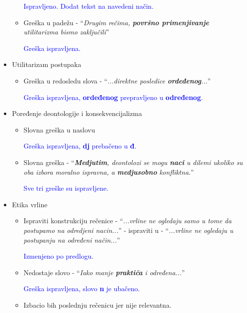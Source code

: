 \documentclass[a4paper]{report}
\newcommand{\odgovor}[1]{\textcolor{blue}{#1}}
\begin{document}
\begin{itemize}
\begin{itemize}
	\odgovor{Ispravljeno. Dodat tekst na navedeni način.}
	
    \item Greška u padežu - ``\textit{Drugim rečima,
\textbf{površno primenjivanje} utilitarizma bismo zaključili}''

	\odgovor{Greška ispravljena.}

    \end{itemize}
    \item Utilitarizam postupaka
    \begin{itemize}
        \item Greška u redosledu slova - ``\textit{...direktne posledice \textbf{ordeđenog}...}''
        
        \odgovor{Greška ispravljena, \textbf{ordeđenog} prepravljeno u \textbf{određenog}.}
        
    \end{itemize}
    \item Poređenje deontologije i konsekvencijalizma
    \begin{itemize}
        \item Slovna greška u naslovu
        
        \odgovor{Greška ispravljena, \textbf{dj} prebačeno u \textbf{đ}.}
        
        \item Slovna greška - ``\textit{\textbf{Medjutim}, deontolozi se mogu \textbf{naci} u dilemi ukoliko su oba izbora
moralno ispravna, a \textbf{medjusobno} konfliktna.}''

		\odgovor{Sve tri greške su ispravljene.}

    \end{itemize}
    \item Etika vrline
    \begin{itemize}
        \item Ispraviti konstrukciju rečenice - ``\textit{...vrline ne ogledaju samo u tome da postupamo na odredjeni nacin...}''
        - ispraviti u - ``\textit{...vrline ne ogledaju u postupanju na određeni način...}'' 
        
        \odgovor{Izmenjeno po predlogu.}
        
        \item Nedostaje slovo - ``\textit{Iako manje \textbf{praktiča} i određena...}''

        \odgovor{Greška ispravljena, slovo \textbf{n} je ubačeno.}

        \item Izbacio bih poslednju rečenicu jer nije relevantna.
        

\end{itemize}
\end{itemize}
\end{document}
